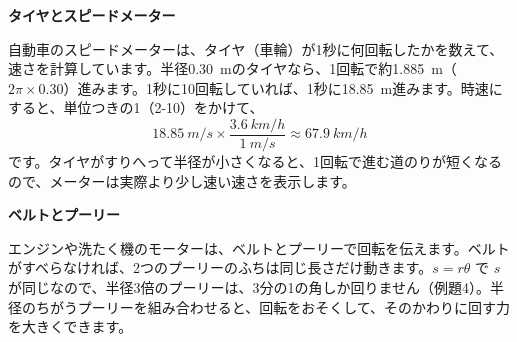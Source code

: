 \begin{butsuri}
\par\addvspace{3pt}\textbf{タイヤとスピードメーター}\par\noindent
\begin{minipage}[c]{0.68\linewidth}\raggedright
自動車のスピードメーターは、タイヤ（車輪）が1秒に何回転したかを数えて、速さを計算しています。半径\qty{0.30}{m}のタイヤなら、1回転で約\qty{1.885}{m}（$2\pi\times0.30$）進みます。1秒に10回転していれば、1秒に\qty{18.85}{m}進みます。時速にすると、単位つきの1（2-10）をかけて、
\[ \qty{18.85}{m/s}\times\frac{\qty{3.6}{km/h}}{\qty{1}{m/s}}\approx\qty{67.9}{km/h} \]
です。タイヤがすりへって半径が小さくなると、1回転で進む道のりが短くなるので、メーターは実際より少し速い速さを表示します。
\end{minipage}\hfill
\begin{minipage}[c]{0.28\linewidth}\centering
{}
\end{minipage}

\par\addvspace{4pt}\textbf{ベルトとプーリー}\par\noindent
\begin{minipage}[c]{0.6\linewidth}\raggedright
エンジンや洗たく機のモーターは、ベルトとプーリーで回転を伝えます。ベルトがすべらなければ、2つのプーリーのふちは同じ長さだけ動きます。$s=r\theta$ で $s$ が同じなので、半径3倍のプーリーは、3分の1の角しか回りません（例題4）。半径のちがうプーリーを組み合わせると、回転をおそくして、そのかわりに回す力を大きくできます。


\end{minipage}
\end{butsuri}
